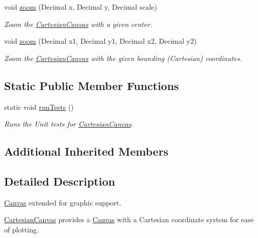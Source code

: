 \begin{DoxyCompactItemize}
void \hyperlink{classtsgl_1_1_cartesian_canvas_a69a378f61868c4c880889c33ec33c992}{zoom} (Decimal x, Decimal y, Decimal scale)
\begin{DoxyCompactList}\small\item\em Zoom the \hyperlink{classtsgl_1_1_cartesian_canvas}{Cartesian\+Canvas} with a given center. \end{DoxyCompactList}\item 
void \hyperlink{classtsgl_1_1_cartesian_canvas_adb1e999087c0ec7e4405d8ebd3ca9760}{zoom} (Decimal x1, Decimal y1, Decimal x2, Decimal y2)
\begin{DoxyCompactList}\small\item\em Zoom the \hyperlink{classtsgl_1_1_cartesian_canvas}{Cartesian\+Canvas} with the given bounding (Cartesian) coordinates. \end{DoxyCompactList}\end{DoxyCompactItemize}
\subsection*{Static Public Member Functions}
\begin{DoxyCompactItemize}
\item 
\hypertarget{classtsgl_1_1_cartesian_canvas_ae40d704629167ff70303a3c55ee3bb43}{}static void \hyperlink{classtsgl_1_1_cartesian_canvas_ae40d704629167ff70303a3c55ee3bb43}{run\+Tests} ()\label{classtsgl_1_1_cartesian_canvas_ae40d704629167ff70303a3c55ee3bb43}

\begin{DoxyCompactList}\small\item\em Runs the Unit tests for \hyperlink{classtsgl_1_1_cartesian_canvas}{Cartesian\+Canvas}. \end{DoxyCompactList}\end{DoxyCompactItemize}
\subsection*{Additional Inherited Members}


\subsection{Detailed Description}
\hyperlink{classtsgl_1_1_canvas}{Canvas} extended for graphic support. 

\hyperlink{classtsgl_1_1_cartesian_canvas}{Cartesian\+Canvas} provides a \hyperlink{classtsgl_1_1_canvas}{Canvas} with a Cartesian coordinate system for ease of plotting. 

